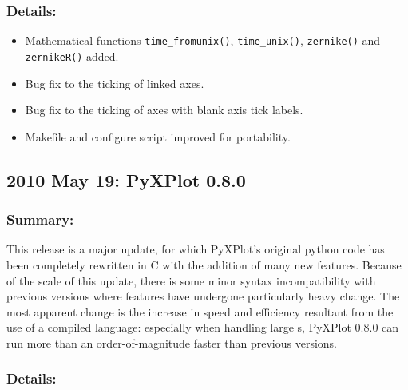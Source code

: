 \subsubsection*{Details:}

\begin{itemize}
\item Mathematical functions {\tt time\_\-from\-unix()}, {\tt time\_\-unix()}, {\tt zernike()} and {\tt zernikeR()} added.
\item Bug fix to the ticking of linked axes.
\item Bug fix to the ticking of axes with blank axis tick labels.
\item Makefile and configure script improved for portability.
\end{itemize}

\subsection*{2010 May 19: PyXPlot 0.8.0}

\subsubsection*{Summary:}

This release is a major update, for which PyXPlot's original python code has
been completely rewritten in C with the addition of many new features. Because
of the scale of this update, there is some minor syntax incompatibility with
previous versions where features have undergone particularly heavy change. The
most apparent change is the increase in speed and efficiency resultant from the
use of a compiled language: especially when handling large \datafile s, PyXPlot
0.8.0 can run more than an order-of-magnitude faster than previous versions.

\subsubsection*{Details:}

